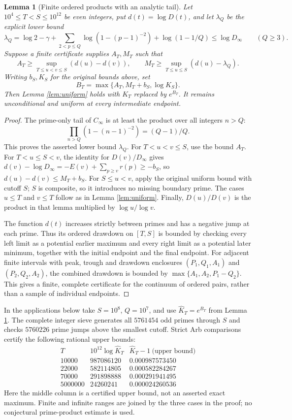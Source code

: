 \documentclass[11pt]{article}
\newtheorem{lemma}[theorem]{Lemma}
\begin{document}
\begin{lemma}[Finite ordered products with an analytic tail]\label{lem:ordered}
Let $10^4\le T<S\le10^{12}$ be even integers, put $d(t)=\log D(t)$,
and let $\lambda_Q$ be the explicit lower bound
\[
\lambda_Q=\log2-\gamma+
\sum_{2<p\le Q}\log(1-(p-1)^{-2})+\log(1-1/Q)
\le\log D_\infty\qquad(Q\ge3).
\]
Suppose a finite certificate supplies $A_T,M_T$ such that
\[
A_T\ge\sup_{T\le u<v\le S}(d(u)-d(v)),\qquad
M_T\ge\sup_{T\le u\le S}(d(u)-\lambda_Q).
\]
Writing $b_S,K_S$ for the original bounds above, set
\[
B_T=\max\{A_T,M_T+b_S,\log K_S\}.
\]
Then Lemma \ref{lem:uniform} holds with $K_T$ replaced by $e^{B_T}$.
It remains unconditional and uniform at every intermediate endpoint.
\end{lemma}
\begin{proof}
The prime-only tail of $C_\infty$ is at least the product over all
integers $n>Q$:
\[
\prod_{n>Q}(1-(n-1)^{-2})=(Q-1)/Q.
\]
This proves the asserted lower bound $\lambda_Q$.
For $T<u<v\le S$, use the bound $A_T$. For $T<u\le S<v$,
the identity for $D(v)/D_\infty$ gives
$d(v)-\log D_\infty=-E(v)+\sum_{p\ge v}r(p)\ge-b_S$,
so $d(u)-d(v)\le M_T+b_S$.
For $S\le u<v$, apply the original uniform bound with cutoff $S$;
$S$ is composite, so it introduces no missing boundary prime.
The cases $u\le T$ and $v\le T$ follow as in Lemma \ref{lem:uniform}.
Finally, $D(u)/D(v)$ is the product in that lemma multiplied by
$\log u/\log v$.

The function $d(t)$ increases strictly between primes and has a
negative jump at each prime. Thus its ordered drawdown on $[T,S]$
is bounded by checking every left limit as a potential earlier
maximum and every right limit as a potential later minimum, together
with the initial endpoint and the final endpoint.
For adjacent finite intervals with peak, trough and drawdown
enclosures $(P_1,Q_1,A_1)$ and $(P_2,Q_2,A_2)$, the combined
drawdown is bounded by
$\max\{A_1,A_2,P_1-Q_2\}$.
This gives a finite, complete certificate for the continuum of ordered
pairs, rather than a sample of individual endpoints.
\end{proof}
In the applications below take $S=10^8$, $Q=10^7$, and use
$\widehat K_T=e^{B_T}$ from Lemma \ref{lem:ordered}.
The complete integer sieve generates all $5761454$ odd primes through
$S$ and checks $5760226$ prime jumps above the smallest cutoff.
Strict Arb comparisons certify the following rational upper bounds:
\[
\begin{array}{r|r|c}
T&10^{12}\log\widehat K_T&\widehat K_T-1\ \text{(upper bound)}\\\hline
10000&987086120&0.000987573450\\
22000&582114805&0.000582284267\\
70000&291898888&0.000291941495\\
5000000&24260241&0.000024260536
\end{array}
\]
Here the middle column is a certified upper bound, not an asserted
exact maximum. Finite and infinite ranges are joined by the three
cases in the proof; no conjectural prime-product estimate is used.
\end{document}
